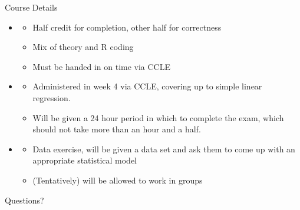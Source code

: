 \documentclass[notheorems,9pt]{beamer}
\begin{document}
\begin{frame}{Course Details} 
	\begin{itemize}
		\item<1-> 
		\begin{itemize}
			\item Half credit for completion, other half for correctness
			\item Mix of theory and R coding
			\item Must be handed in on time via CCLE
		\end{itemize}
		\item<2-> 
		\begin{itemize}
			\item Administered in week 4 via CCLE, covering up to simple linear regression.
			\item Will be given a 24 hour period in which to complete the exam, which should not take more than an hour and a half.
		\end{itemize}
		\item<3-> 
		\begin{itemize}
			\item Data exercise, will be given a data set and ask them to come up with an appropriate statistical model
			\item (Tentatively) will be allowed to work in groups
		\end{itemize}
	\end{itemize}
\end{frame}

\begin{frame}{Questions?} 
	\centering{} 
\end{frame}
\end{document}
